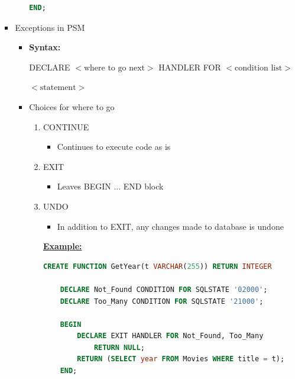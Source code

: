 \documentclass[12pt]{article}
\begin{document}
\begin{enumerate}[1.]
\begin{enumerate}[a)]
\begin{itemize}
\begin{itemize}
\begin{lstlisting}[language=SQL]
    END;
    \end{lstlisting}
        \end{itemize}

        \item Exceptions in PSM
        \begin{itemize}
            \item \textbf{Syntax:}

            DECLARE $<\text{where to go next}>$ HANDLER FOR $<\text{condition list}>$

                $<\text{statement}>$

            \item Choices for where to go
            \begin{enumerate}[1.]
                \item CONTINUE
                \begin{itemize}
                    \item Continues to execute code as is
                \end{itemize}
                \item EXIT
                \begin{itemize}
                    \item Leaves BEGIN ... END block
                \end{itemize}
                \item UNDO
                \begin{itemize}
                    \item In addition to EXIT, any changes made to database is undone
                \end{itemize}

                \bigskip

                \underline{\textbf{Example:}}

                \bigskip

    \begin{lstlisting}[language=SQL]
    CREATE FUNCTION GetYear(t VARCHAR(255)) RETURN INTEGER

    DECLARE Not_Found CONDITION FOR SQLSTATE '02000';
    DECLARE Too_Many CONDITION FOR SQLSTATE '21000';

    BEGIN
        DECLARE EXIT HANDLER FOR Not_Found, Too_Many
            RETURN NULL;
        RETURN (SELECT year FROM Movies WHERE title = t);
    END;
    \end{lstlisting}
            \end{enumerate}
        \end{itemize}


\end{itemize}
\end{enumerate}
\end{enumerate}
\end{document}
